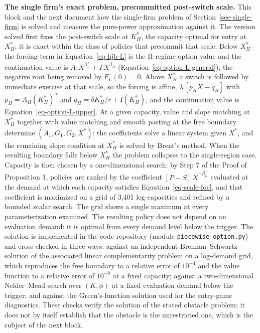 \documentclass[
  11pt,
  letterpaper,
]{scrartcl}
\begin{document}
\textbf{The single firm's exact problem, precommitted post-switch
scale.} This block and the next document how the single-firm problem of
Section~\ref{sec-single-firm} is solved and measure the pure-power
approximation against it. The version solved first fixes the post-switch
scale at \(K_H^*\), the capacity optimal for entry at \(X_H^*\); it is
exact within the class of policies that precommit that scale. Below
\(X_H^*\) the forcing term in Equation~\ref{eq-hjb-L} is the H-regime
option value and the continuation value is
\(A_1 X^{\beta_L^+} + \Gamma X^{\beta_H}\)
(Equation~\ref{eq-option-L-general}), the negative root being removed by
\(F_L(0) = 0\). Above \(X_H^*\) a switch is followed by immediate
exercise at that scale, so the forcing is affine,
\(\lambda\,[p_H X - q_H]\) with \(p_H = A_H (K_H^*)^\alpha\) and
\(q_H = \delta K_H^*/r + I(K_H^*)\), and the continuation value is
Equation~\ref{eq-option-L-upper}. At a given capacity, value and slope
matching at \(X_H^*\) together with value matching and smooth pasting at
the free boundary determine \((A_1, G_1, G_2, X^*)\): the coefficients
solve a linear system given \(X^*\), and the remaining slope condition
at \(X_H^*\) is solved by Brent's method. When the resulting boundary
falls below \(X_H^*\) the problem collapses to the single-region case.
Capacity is then chosen by a one-dimensional search: by Step 7 of the
Proof of Proposition 1, policies are ranked by the coefficient
\([P - S]\,\bar{X}^{-\beta_L^+}\) evaluated at the demand at which each
capacity satisfies Equation~\ref{eq-scale-foc}, and that coefficient is
maximized on a grid of 3,401 log-capacities and refined by a bounded
scalar search. The grid shows a single maximum at every parameterization
examined. The resulting policy does not depend on an evaluation demand:
it is optimal from every demand level below the trigger. The solution is
implemented in the code repository (module
\texttt{piecewise\_option.py}) and cross-checked in three ways: against
an independent Brennan--Schwartz solution of the associated linear
complementarity problem on a log-demand grid, which reproduces the free
boundary to a relative error of \(10^{-4}\) and the value function to a
relative error of \(10^{-9}\) at a fixed capacity; against a
two-dimensional Nelder--Mead search over \((K, \phi)\) at a fixed
evaluation demand below the trigger; and against the Green's-function
solution used for the entry-game diagnostics. These checks verify the
solution of the stated obstacle problem; it does not by itself establish
that the obstacle is the unrestricted one, which is the subject of the
next block.
\end{document}
